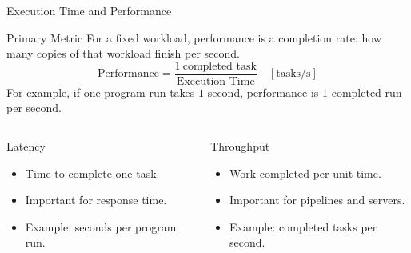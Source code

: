 \documentclass[aspectratio=169,11pt,t]{beamer}
\begin{document}
\begin{frame}{Execution Time and Performance}
\begin{block}{Primary Metric}
For a fixed workload, performance is a completion rate: how many copies of that workload finish per second.
\[
\text{Performance}=\frac{1\ \text{completed task}}{\text{Execution Time}}
\quad [\text{tasks/s}]
\]
For example, if one program run takes $1$ second, performance is $1$ completed run per second.
\end{block}
\vspace{0.05cm}
\begin{columns}[T,onlytextwidth]
\begin{block}{Latency}
\begin{itemize}
\item Time to complete one task.
\item Important for response time.
\item Example: seconds per program run.
\end{itemize}
\end{block}
\begin{block}{Throughput}
\begin{itemize}
\item Work completed per unit time.
\item Important for pipelines and servers.
\item Example: completed tasks per second.
\end{itemize}
\end{block}
\end{columns}
\end{frame}










\end{document}
